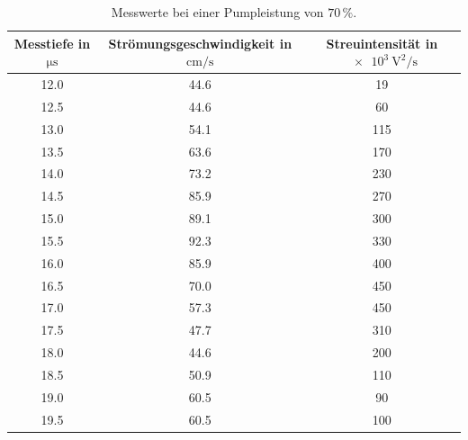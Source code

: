 \begin{table}
    \centering
    \caption{Messwerte bei einer Pumpleistung von $70\,\%$.}
    \label{tab:70percent}
    \begin{tabular}{c c c}
        \toprule
        Messtiefe in $\si{\micro\second}$ & Strömungsgeschwindigkeit in $\si{\centi\meter\per\second}$ & Streuintensität in $\SI{e3}{\volt\squared\per\second}$ \\
        \midrule
        12.0 & 44.6 &  19 \\
        12.5 & 44.6 &  60 \\
        13.0 & 54.1 & 115 \\
        13.5 & 63.6 & 170 \\
        14.0 & 73.2 & 230 \\
        14.5 & 85.9 & 270 \\
        15.0 & 89.1 & 300 \\
        15.5 & 92.3 & 330 \\
        16.0 & 85.9 & 400 \\
        16.5 & 70.0 & 450 \\
        17.0 & 57.3 & 450 \\
        17.5 & 47.7 & 310 \\
        18.0 & 44.6 & 200 \\
        18.5 & 50.9 & 110 \\
        19.0 & 60.5 &  90 \\
        19.5 & 60.5 & 100 \\
        \bottomrule
    \end{tabular}
\end{table}

